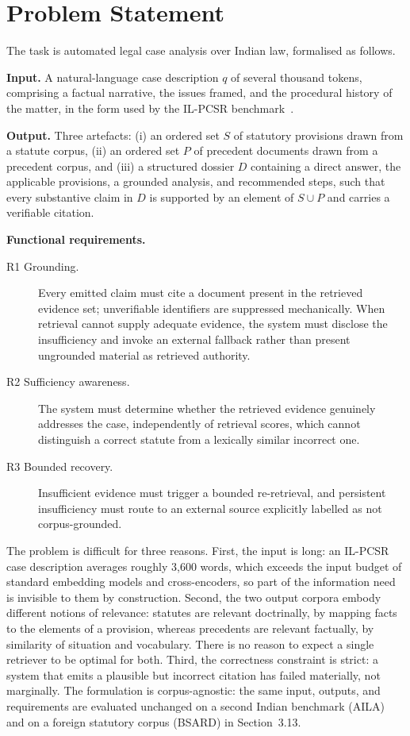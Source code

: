 \documentclass{mnnit}
\begin{document}
\section{Problem Statement}
The task is automated legal case analysis over Indian law,
formalised as follows.

\medskip
\noindent\textbf{Input.} A natural-language case description $q$
of several thousand tokens, comprising a factual narrative, the
issues framed, and the procedural history of the matter, in the
form used by the IL-PCSR benchmark~\cite{ilpcsr}.

\medskip
\noindent\textbf{Output.} Three artefacts: (i) an ordered set $S$
of statutory provisions drawn from a statute corpus, (ii) an
ordered set $P$ of precedent documents drawn from a precedent
corpus, and (iii) a structured dossier $D$ containing a direct
answer, the applicable provisions, a grounded analysis, and
recommended steps, such that every substantive claim in $D$ is
supported by an element of $S \cup P$ and carries a verifiable
citation.

\medskip
\noindent\textbf{Functional requirements.}
\begin{description}
\item[R1 Grounding.] Every emitted claim must cite a document
  present in the retrieved evidence set; unverifiable identifiers
  are suppressed mechanically. When retrieval cannot supply
  adequate evidence, the system must disclose the insufficiency
  and invoke an external fallback rather than present ungrounded
  material as retrieved authority.
\item[R2 Sufficiency awareness.] The system must determine
  whether the retrieved evidence genuinely addresses the case,
  independently of retrieval scores, which cannot distinguish a
  correct statute from a lexically similar incorrect one.
\item[R3 Bounded recovery.] Insufficient evidence must trigger a
  bounded re-retrieval, and persistent insufficiency must route
  to an external source explicitly labelled as not
  corpus-grounded.
\end{description}

\medskip
The problem is difficult for three reasons. First, the input is
long: an IL-PCSR case description averages roughly 3,600 words,
which exceeds the input budget of standard embedding models and
cross-encoders, so part of the information need is invisible to
them by construction. Second, the two output corpora embody
different notions of relevance: statutes are relevant
doctrinally, by mapping facts to the elements of a provision,
whereas precedents are relevant factually, by similarity of
situation and vocabulary. There is no reason to expect a single
retriever to be optimal for both. Third, the correctness
constraint is strict: a system that emits a plausible but
incorrect citation has failed materially, not marginally. The
formulation is corpus-agnostic: the same input, outputs, and
requirements are evaluated unchanged on a second Indian
benchmark (AILA) and on a foreign statutory corpus (BSARD) in
Section~3.13.
\end{document}
